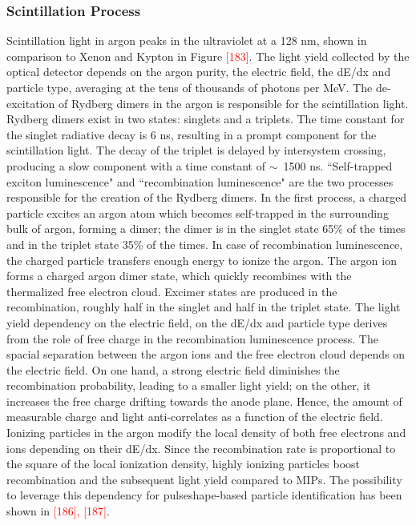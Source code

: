 \subsubsection{Scintillation Process}
Scintillation light in argon peaks in the ultraviolet at a 128 nm, shown in comparison to Xenon and Kypton in Figure  \textcolor{red}{[183]}. The light yield collected by the optical detector depends on the argon purity, the electric field, the dE/dx and particle type, averaging at the tens of thousands of photons per MeV. 
The de-excitation of Rydberg dimers in the argon is responsible for the scintillation light. 
Rydberg dimers exist in two states:  singlets and a triplets. The time constant for the singlet radiative decay is 6 ns, resulting in a prompt component for the scintillation light. The decay of the triplet is delayed by intersystem crossing, producing a slow component with a time constant of $\sim$~1500 ns.  ``Self-trapped exciton luminescence" and  ``recombination luminescence" are the two processes responsible for the creation of the Rydberg dimers. In the first process, a charged particle excites an argon atom which becomes self-trapped in the surrounding bulk of argon,  forming a dimer; the dimer is in the singlet state 65\% of the times and in the triplet state 35\% of the times. In case of recombination luminescence, the charged particle transfers enough energy to ionize the argon. The argon ion forms a charged argon dimer state, which quickly recombines with the thermalized free electron cloud. Excimer states are produced in the recombination, roughly half in the singlet and half in the triplet state. The light yield dependency on the electric field, on the dE/dx and particle type derives from the role of free charge in the recombination luminescence process. The spacial separation between the argon ions and the free electron cloud depends on the electric field. On one hand, a strong electric field diminishes the recombination probability, leading to a smaller light yield; on the other, it increases the free charge drifting towards the anode plane. Hence, the amount of  measurable charge and light anti-correlates as a function of the electric field.  Ionizing particles in the argon modify the local density of both free electrons and ions depending on their dE/dx. Since the recombination rate is proportional to the square of the local ionization density, highly ionizing particles boost recombination and the subsequent light yield compared to MIPs.  The possibility to leverage this dependency for pulseshape-based particle identification has been shown in \textcolor{red}{[186], [187]}.

